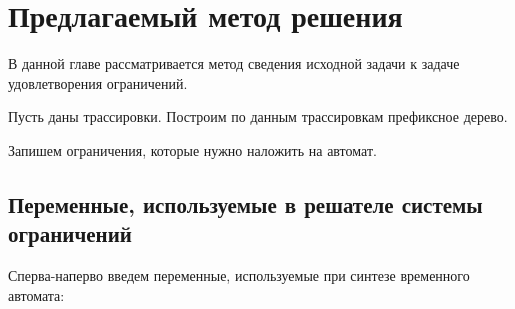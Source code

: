 \documentclass[times,specification,annotation]{itmo-student-thesis}
\begin{document}
\chapter{Предлагаемый метод решения}

В данной главе рассматривается метод сведения исходной задачи к задаче удовлетворения ограничений. 

Пусть даны трассировки. Построим по данным трассировкам префиксное дерево.

Запишем ограничения, которые нужно наложить на автомат.

\section{Переменные, используемые в решателе системы ограничений}

Сперва-наперво введем переменные, используемые при синтезе временного автомата:
\end{document}
